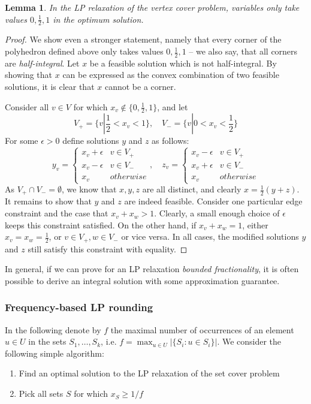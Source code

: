 \documentclass{article}
\newtheorem{lemma}{Lemma}
\begin{document}
\begin{lemma}
In the LP relaxation of the vertex cover problem, variables only take values $0,\frac{1}{2},1$ in the optimum solution.
\end{lemma}
\begin{proof}
We show even a stronger statement, namely that every corner of the polyhedron defined above only takes values $0,\frac{1}{2},1$ -- we also say, that all corners are \emph{half-integral}. Let $x$ be a feasible solution which 
is not half-integral. By showing that $x$ can be expressed as the convex combination of two feasible solutions, it is clear that $x$ cannot be a corner.

Consider all $v\in V$ for which $x_v\notin \{0,\frac{1}{2}, 1\}$, and let
\[
	V_+=\{v|\frac{1}{2}<x_v<1\},\quad V_-=\{v|0<x_v<\frac{1}{2}\}
\]
For some $\epsilon>0$ define solutions $y$ and $z$ as follows:
\[
	y_v= \left\{ \begin{array}{rl} x_v+\epsilon& v\in V_+\\ x_v-\epsilon& v\in V_-\\ x_v& otherwise \end{array} \right., \quad z_v= \left\{ \begin{array}{rl} x_v-\epsilon& v\in V_+\\ x_v+\epsilon& v\in V_-\\ x_v& otherwise \end{array} \right.
\]
As $V_+\cap V_-=\emptyset$, we know that $x, y, z$ are all distinct, and clearly $x=\frac{1}{2}(y+z)$. It remains to show that $y$ and $z$ are indeed feasible. Consider one particular edge constraint and the case that $x_v+x_w>1$. Clearly, a small enough choice of $\epsilon$ keeps this constraint satisfied. On the other hand, if $x_v+x_w=1$, either $x_v=x_w=\frac{1}{2}$, or $v\in V_+, w\in V_-$ or vice versa. In all cases, the modified solutions $y$ and $z$ still satisfy this constraint with equality. 
\end{proof}
In general, if we can prove for an LP relaxation \emph{bounded fractionality}, it is often possible to derive an integral solution with some approximation guarantee.

\subsubsection{Frequency-based LP rounding}
In the following denote by $f$ the maximal number of occurrences of an element $u\in U$ in the sets $S_1,\dots, S_k$, i.e.
$f=\max_{u\in U} |\{S_i: u\in S_i\}|$. We consider the following simple algorithm:
\begin{enumerate}
\item Find an optimal solution to the LP relaxation of the set cover problem
\item Pick all sets $S$ for which $x_S\geq 1/f$
\end{enumerate}
\end{document}
